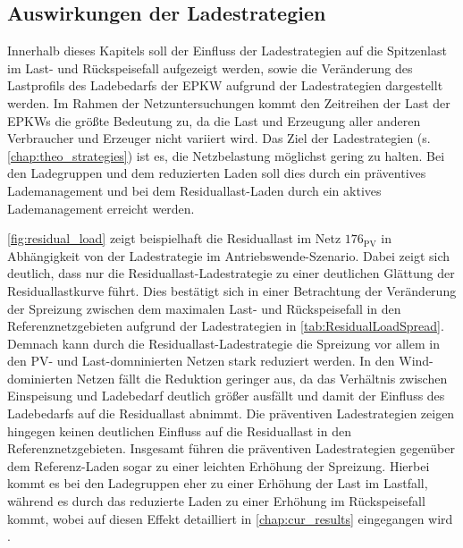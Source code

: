 


\subsection{Auswirkungen der Ladestrategien}\label{chap:results_charging_strategies}

Innerhalb dieses Kapitels soll der Einfluss der Ladestrategien auf die Spitzenlast im Last- und Rückspeisefall aufgezeigt werden, sowie die Veränderung des Lastprofils des Ladebedarfs der \gls{EPKW} aufgrund der Ladestrategien dargestellt werden.
Im Rahmen der Netzuntersuchungen kommt den Zeitreihen der Last der \glspl{EPKW} die größte Bedeutung zu, da die Last und Erzeugung aller anderen Verbraucher und Erzeuger nicht variiert wird.
Das Ziel der Ladestrategien (s. \autoref{chap:theo_strategies}) ist es, die Netzbelastung möglichst gering zu halten.
Bei den Ladegruppen und dem reduzierten Laden soll dies durch ein präventives Lademanagement und bei dem Residuallast-Laden durch ein aktives Lademanagement erreicht werden.



\autoref{fig:residual_load} zeigt beispielhaft die Residuallast im Netz \(176_{\text{PV}}\) in Abhängigkeit von der Ladestrategie im Antriebswende-Szenario.
Dabei zeigt sich deutlich, dass nur die Residuallast-Ladestrategie zu einer deutlichen Glättung der Residuallastkurve führt.
Dies bestätigt sich in einer Betrachtung der Veränderung der Spreizung zwischen dem maximalen Last- und Rückspeisefall in den Referenznetzgebieten aufgrund der Ladestrategien in \autoref{tab:ResidualLoadSpread}.
Demnach kann durch die Residuallast-Ladestrategie die Spreizung vor allem in den \gls{PV}- und Last-domninierten Netzen stark reduziert werden.
In den Wind-dominierten Netzen fällt die Reduktion geringer aus, da das Verhältnis zwischen Einspeisung und Ladebedarf deutlich größer ausfällt und damit der Einfluss des Ladebedarfs auf die Residuallast abnimmt.
Die präventiven Ladestrategien zeigen hingegen keinen deutlichen Einfluss auf die Residuallast in den Referenznetzgebieten.
Insgesamt führen die präventiven Ladestrategien gegenüber dem Referenz-Laden sogar zu einer leichten Erhöhung der Spreizung.
Hierbei kommt es bei den Ladegruppen eher zu einer Erhöhung der Last im Lastfall, während es durch das reduzierte Laden zu einer Erhöhung im Rückspeisefall kommt, wobei auf diesen Effekt detailliert in \autoref{chap:cur_results} eingegangen wird .

